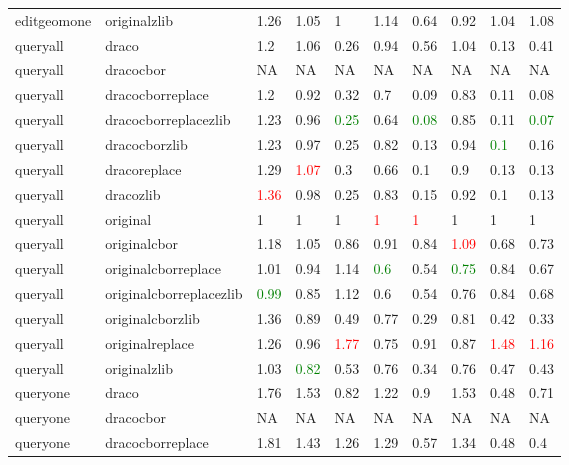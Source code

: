 \begin{landscape}
\begin{longtable}{llllllllll}
\rowcolor{lightgray}  editgeomone & originalzlib & 1.26 & 1.05 & 1 & 1.14 & 0.64 & 0.92 & 1.04 & 1.08\\
\rowcolor{lightgray}  queryall & draco & 1.2 & 1.06 & 0.26 & 0.94 & 0.56 & 1.04 & 0.13 & 0.41\\
\rowcolor{lightgray}  queryall & dracocbor & NA & NA & NA & NA & NA & NA & NA & NA\\
\rowcolor{lightgray}  queryall & dracocborreplace & 1.2 & 0.92 & 0.32 & 0.7 & 0.09 & 0.83 & 0.11 & 0.08\\
\rowcolor{lightgray}  queryall & dracocborreplacezlib & 1.23 & 0.96 & \textcolor{green}{0.25} & 0.64 & \textcolor{green}{0.08} & 0.85 & 0.11 & \textcolor{green}{0.07}\\
\rowcolor{lightgray}  queryall & dracocborzlib & 1.23 & 0.97 & 0.25 & 0.82 & 0.13 & 0.94 & \textcolor{green}{0.1} & 0.16\\
\rowcolor{lightgray}  queryall & dracoreplace & 1.29 & \textcolor{red}{1.07} & 0.3 & 0.66 & 0.1 & 0.9 & 0.13 & 0.13\\
\rowcolor{lightgray}  queryall & dracozlib & \textcolor{red}{1.36} & 0.98 & 0.25 & 0.83 & 0.15 & 0.92 & 0.1 & 0.13\\
queryall & original & 1 & 1 & 1 & \textcolor{red}{1} & \textcolor{red}{1} & 1 & 1 & 1\\
queryall & originalcbor & 1.18 & 1.05 & 0.86 & 0.91 & 0.84 & \textcolor{red}{1.09} & 0.68 & 0.73\\
queryall & originalcborreplace & 1.01 & 0.94 & 1.14 & \textcolor{green}{0.6} & 0.54 & \textcolor{green}{0.75} & 0.84 & 0.67\\
queryall & originalcborreplacezlib & \textcolor{green}{0.99} & 0.85 & 1.12 & 0.6 & 0.54 & 0.76 & 0.84 & 0.68\\
queryall & originalcborzlib & 1.36 & 0.89 & 0.49 & 0.77 & 0.29 & 0.81 & 0.42 & 0.33\\
queryall & originalreplace & 1.26 & 0.96 & \textcolor{red}{1.77} & 0.75 & 0.91 & 0.87 & \textcolor{red}{1.48} & \textcolor{red}{1.16}\\
queryall & originalzlib & 1.03 & \textcolor{green}{0.82} & 0.53 & 0.76 & 0.34 & 0.76 & 0.47 & 0.43\\
queryone & draco & 1.76 & 1.53 & 0.82 & 1.22 & 0.9 & 1.53 & 0.48 & 0.71\\
queryone & dracocbor & NA & NA & NA & NA & NA & NA & NA & NA\\
queryone & dracocborreplace & 1.81 & 1.43 & 1.26 & 1.29 & 0.57 & 1.34 & 0.48 & 0.4\\

\end{longtable}
\end{landscape}
